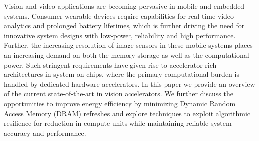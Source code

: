 Vision and video applications are becoming pervasive in mobile and embedded systems. 
Consumer wearable devices require capabilities for real-time video analytics 
and prolonged battery lifetimes, which is further driving 
the need for innovative system designs 
with low-power, reliability and high performance. 
Further, the increasing resolution of image sensors in these mobile systems places an increasing demand on 
both the memory storage as well as the computational power. 
Such stringent requirements have given rise to accelerator-rich architectures in system-on-chips, where the 
primary computational burden is handled by dedicated hardware accelerators. In this paper we provide an overview of the 
current state-of-the-art in vision accelerators.
We further discuss the opportunities to improve energy efficiency 
by minimizing Dynamic Random Access Memory (DRAM) refreshes and explore techniques to exploit algorithmic resilience for reduction in compute units
while maintaining reliable system accuracy and performance.

